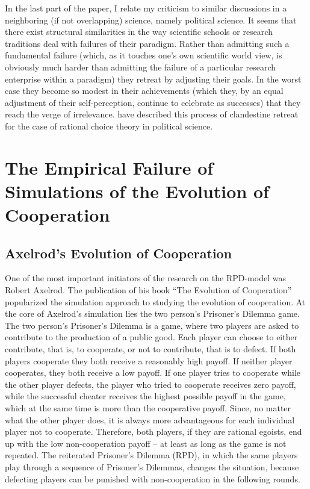 \documentclass[graybox, English]{svmult}
\begin{document}
In the last part of the paper, I relate my criticism to similar
discussions in a neighboring (if not overlapping) science, namely
political science. It seems that there exist structural similarities
in the way scientific schools or research traditions deal with failures
of their paradigm. Rather than admitting such a fundamental failure
(which, as it touches one's own scientific world view, is obviously much
harder than admitting the failure of a particular research enterprise
within a paradigm) they retreat by adjusting their goals. In the worst
case they become so modest in their achievements (which they, by an
equal adjustment of their self-perception, continue to celebrate as successes)
that they reach the verge of irrelevance. \citet[44f.]{green-shapiro:1994}
have described this process of clandestine retreat for the case of
rational choice theory in political science.


\section{The Empirical Failure of Simulations of the Evolution of Cooperation}

\subsection{Axelrod's Evolution of Cooperation}

One of the most important initiators of the research on the RPD-model
was Robert Axelrod. The publication of his book ``The Evolution of
Cooperation'' popularized the simulation approach to studying the
evolution of cooperation. At the core of Axelrod's simulation lies the
two person's Prisoner's Dilemma game. The two person's Prisoner's
Dilemma is a game, where two players are asked to contribute to the
production of a public good. Each player can choose to either
contribute, that is, to cooperate, or not to contribute, that is to
defect. If both players cooperate they both receive a reasonably high
payoff. If neither player cooperates, they both receive a low
payoff. If one player tries to cooperate while the other player
defects, the player who tried to cooperate receives zero payoff, while
the successful cheater receives the highest possible payoff in the
game, which at the same time is more than the cooperative
payoff. Since, no matter what the other player does, it is always more
advantageous for each individual player not to cooperate. Therefore,
both players, if they are rational egoists, end up with the low
non-cooperation payoff -- at least as long as the game is not
repeated. The reiterated Prisoner's Dilemma (RPD), in which the same
players play through a sequence of Prisoner's Dilemmas, changes the
situation, because defecting players can be punished with
non-cooperation in the following rounds.
\end{document}

